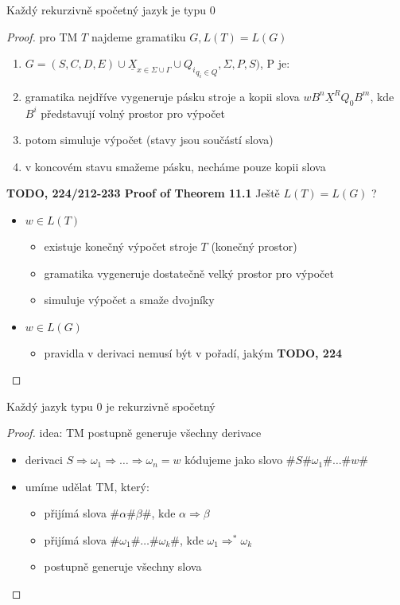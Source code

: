 \documentclass[../main.tex]{subfiles}
\begin{document}
 \begin{theorem}
     Každý rekurzivně spočetný jazyk je typu 0
     \begin{proof}
         pro TM $T$ najdeme gramatiku $G, L(T) = L(G)$
         \begin{enumerate}
             \item $G = ({S,C,D,E})\cup {\underline{X}}_{x \in \Sigma \cup \Gamma} \cup {Q_i}_{q_i \in Q},\Sigma,P,S)$, P je:
             \item gramatika nejdříve vygeneruje pásku stroje a kopii slova $wB^n\underline{X}^RQ_0B^m$, kde $B^i$ představují volný prostor pro výpočet
             \item potom simuluje výpočet (stavy jsou součástí slova)
             \item v koncovém stavu smažeme pásku, necháme pouze kopii slova
         \end{enumerate}
         \textbf{TODO, 224/212-233 Proof of Theorem 11.1}
         Ještě  $L(T) = L(G)$ ?
         \begin{itemize}
             \item $w \in L(T)$
             \begin{itemize}
                 \item existuje konečný výpočet stroje $T$ (konečný prostor)
                 \item gramatika vygeneruje dostatečně velký prostor pro výpočet
                 \item simuluje výpočet a smaže dvojníky
             \end{itemize}
             \item $w \in L(G)$
             \begin{itemize}
                 \item pravidla v derivaci nemusí být v pořadí, jakým \textbf{TODO, 224}
             \end{itemize}
         \end{itemize}
     \end{proof}
 \end{theorem}
 \begin{theorem}
     Každý jazyk typu 0 je rekurzivně spočetný
     \begin{proof}
         idea: TM postupně generuje všechny derivace
         \begin{itemize}
             \item derivaci $S \Rightarrow \omega_1 \Rightarrow \dots \Rightarrow \omega_n = w$ kódujeme jako slovo $\#S\#\omega_1\#\dots\#w\#$
             \item umíme udělat TM, který:
             \begin{itemize}
                 \item přijímá slova $\#\alpha\#\beta\#$, kde $\alpha \Rightarrow \beta$
                 \item přijímá slova $\#\omega_1\#\dots\#\omega_k\#$, kde $\omega_1 \Rightarrow^* \omega_k$
                 \item postupně generuje všechny slova
             \end{itemize}
         \end{itemize}
     \end{proof}
 \end{theorem}
\end{document}
